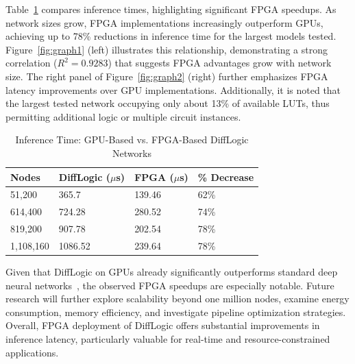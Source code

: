 Table~\ref{tab:fpga_comparison} compares inference times, highlighting significant FPGA speedups. As network sizes grow, FPGA implementations increasingly outperform GPUs, achieving up to 78\% reductions in inference time for the largest models tested. Figure~\ref{fig:graph1} (left) illustrates this relationship, demonstrating a strong correlation ($R^2=0.9283$) that suggests FPGA advantages grow with network size. The right panel of Figure~\ref{fig:graph2} (right) further emphasizes FPGA latency improvements over GPU implementations. Additionally, it is noted that the largest tested network occupying only about 13\% of available LUTs, thus permitting additional logic or multiple circuit instances.

\begin{table}[htbp]
\caption{Inference Time: GPU-Based vs. FPGA-Based DiffLogic Networks}
\label{tab:fpga_comparison}
\begin{tabularx}{\textwidth}{lXXX}
\hline
Nodes & DiffLogic ($\mu$s) & FPGA ($\mu$s) & \% Decrease \\
\hline
51,200   & 365.7   & 139.46 & 62\% \\
614,400  & 724.28  & 280.52 & 74\% \\
819,200  & 907.78  & 202.54 & 78\% \\
1,108,160 & 1086.52 & 239.64 & 78\% \\
\hline
\end{tabularx}
\end{table}


Given that DiffLogic on GPUs already significantly outperforms standard deep neural networks~\cite{difflogic}, the observed FPGA speedups are especially notable. Future research will further explore scalability beyond one million nodes, examine energy consumption, memory efficiency, and investigate pipeline optimization strategies. Overall, FPGA deployment of DiffLogic offers substantial improvements in inference latency, particularly valuable for real-time and resource-constrained applications.



